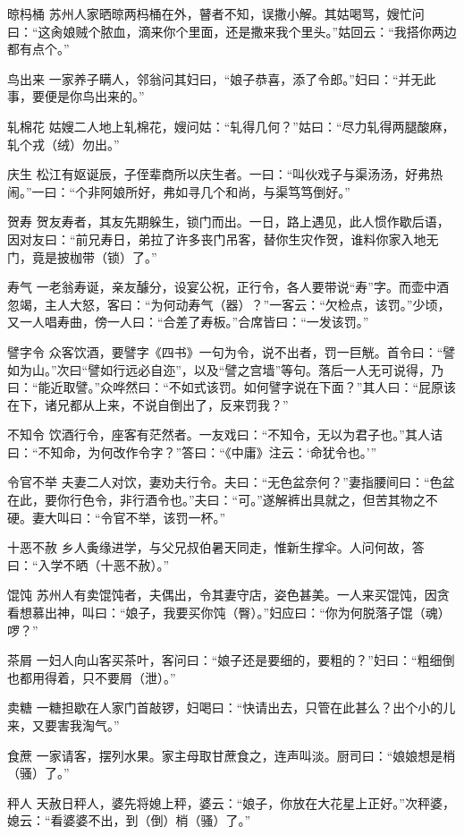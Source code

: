 \documentclass[12pt,UTF8]{ctexbook}
\begin{document}
晾杩桶
苏州人家晒晾两杩桶在外，瞽者不知，误撒小解。其姑喝骂，嫂忙问曰：“这肏娘贼个脓血，滴来你个里面，还是撒来我个里头。”姑回云：“我搭你两边都有点个。”

鸟出来
一家养子瞒人，邻翁问其妇曰，“娘子恭喜，添了令郎。”妇曰：“并无此事，要便是你鸟出来的。”

轧棉花
姑嫂二人地上轧棉花，嫂问姑：“轧得几何？”姑曰：“尽力轧得两腿酸麻，轧个戎（绒）勿出。”

庆生
松江有妪诞辰，子侄辈商所以庆生者。一曰：“叫伙戏子与渠汤汤，好弗热闹。”一曰：“个非阿娘所好，弗如寻几个和尚，与渠笃笃倒好。”

贺寿
贺友寿者，其友先期躲生，锁门而出。一日，路上遇见，此人惯作歇后语，因对友曰：“前兄寿日，弟拉了许多丧门吊客，替你生灾作贺，谁料你家入地无门，竟是披枷带（锁）了。”

寿气
一老翁寿诞，亲友醵分，设宴公祝，正行令，各人要带说“寿”字。而壶中酒忽竭，主人大怒，客曰：“为何动寿气（器）？”一客云：“欠检点，该罚。”少顷，又一人唱寿曲，傍一人曰：“合差了寿板。”合席皆曰：“一发该罚。”

譬字令
众客饮酒，要譬字《四书》一句为令，说不出者，罚一巨觥。首令曰：“譬如为山。”次曰“譬如行远必自迩”，以及“譬之宫墙”等句。落后一人无可说得，乃曰：“能近取譬。”众哗然曰：“不如式该罚。如何譬字说在下面？”其人曰：“屁原该在下，诸兄都从上来，不说自倒出了，反来罚我？”

不知令
饮酒行令，座客有茫然者。一友戏曰：“不知令，无以为君子也。”其人诘曰：“不知命，为何改作令字？”答曰：“《中庸》注云：‘命犹令也。’”

令官不举
夫妻二人对饮，妻劝夫行令。夫曰：“无色盆奈何？”妻指腰间曰：“色盆在此，要你行色令，非行酒令也。”夫曰：“可。”遂解裤出具就之，但苦其物之不硬。妻大叫曰：“令官不举，该罚一杯。”

十恶不赦
乡人夤缘进学，与父兄叔伯暑天同走，惟新生撑伞。人问何故，答曰：“入学不晒（十恶不赦）。”

馄饨
苏州人有卖馄饨者，夫偶出，令其妻守店，姿色甚美。一人来买馄饨，因贪看想慕出神，叫曰：“娘子，我要买你饨（臀）。”妇应曰：“你为何脱落子馄（魂）啰？”

茶屑
一妇人向山客买茶叶，客问曰：“娘子还是要细的，要粗的？”妇曰：“粗细倒也都用得着，只不要屑（泄）。”

卖糖
一糖担歇在人家门首敲锣，妇喝曰：“快请出去，只管在此甚么？出个小的儿来，又要害我淘气。”

食蔗
一家请客，摆列水果。家主母取甘蔗食之，连声叫淡。厨司曰：“娘娘想是梢（骚）了。”

秤人
天赦日秤人，婆先将媳上秤，婆云：“娘子，你放在大花星上正好。”次秤婆，媳云：“看婆婆不出，到（倒）梢（骚）了。”
\end{document}
